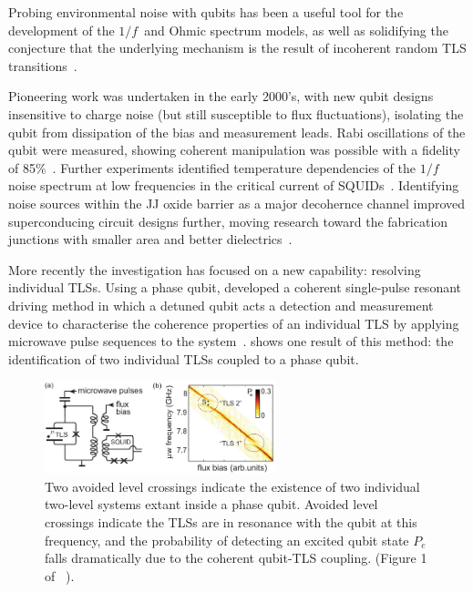 Probing environmental noise with qubits has been a useful tool for the development of the $1/f\,$ and Ohmic spectrum models, as well as solidifying the conjecture that the underlying mechanism is the result of incoherent random TLS transitions~\cite{Shnirman2005}.

Pioneering work was undertaken in the early 2000's, with new qubit designs insensitive to charge noise (but still susceptible to flux fluctuations), isolating the qubit from dissipation of the bias and measurement leads.
Rabi oscillations of the qubit were measured, showing coherent manipulation was possible with a fidelity of 85\%~\cite{Martinis2002}.
Further experiments identified temperature dependencies of the $1/f\,$ noise spectrum at low frequencies in the critical current of SQUIDs~\cite{Wellstood2004}.
Identifying noise sources within the JJ oxide barrier as a major decohernce channel improved superconducing circuit designs further, moving research toward the fabrication junctions with smaller area and better dielectrics~\cite{Martinis2005}.

More recently the investigation has focused on a new capability: resolving individual TLSs.
Using a phase qubit, \citeauthor{Lisenfeld2010} developed a coherent single-pulse resonant driving method in which a detuned qubit acts a detection and measurement device to characterise the coherence properties of an individual TLS by applying microwave pulse sequences to the system~\cite{Lisenfeld2010}.  shows one result of this method: the identification of two individual TLSs coupled to a phase qubit.

\begin{figure}[htp]
\includegraphics[width=0.6\textwidth]{figures/alclisenfeld2010}
\caption[Avoided Level Crossings in Qubit Spectroscopy]{\label{fig:alc}Two avoided level crossings indicate the existence of two individual two-level systems extant inside a phase qubit. Avoided level crossings indicate the TLSs are in resonance with the qubit at this frequency, and the probability of detecting an excited qubit state $P_e$ falls dramatically due to the coherent qubit-TLS coupling. (Figure 1 of \citeauthor{Lisenfeld2010}~\cite{Lisenfeld2010}).}
\end{figure}

